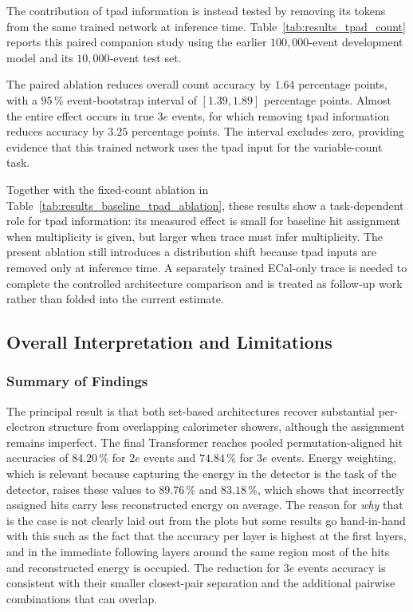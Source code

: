 The contribution of \gls{tpad} information is instead tested by removing its
tokens from the same trained network at inference time.
Table~\ref{tab:results_tpad_count} reports this paired companion study using
the earlier \(100{,}000\)-event development model and its \(10{,}000\)-event
test set.



The paired ablation reduces overall count accuracy by \(1.64\) percentage
points, with a \(95\,\%\) event-bootstrap interval of
\([1.39,1.89]\) percentage points. Almost the entire effect occurs in true
\(3e\) events, for which removing \gls{tpad} information reduces accuracy by
\(3.25\) percentage points. The interval excludes zero, providing evidence
that this trained network uses the \gls{tpad} input for the variable-count
task.

Together with the fixed-count ablation in
Table~\ref{tab:results_baseline_tpad_ablation}, these results show a
task-dependent role for \gls{tpad} information: its measured effect is small
for baseline hit assignment when multiplicity is given, but larger when \gls{trace} must infer multiplicity. The present ablation still
introduces a distribution shift because \gls{tpad} inputs are removed only at
inference time. A separately trained ECal-only \gls{trace} is needed to
complete the controlled architecture comparison and is treated as follow-up
work rather than folded into the current estimate.


\clearpage
\subsection{Overall Interpretation and Limitations}
\label{sec:results_overall_interpretation}

\subsubsection{Summary of Findings}

The principal result is that both set-based architectures recover substantial
per-electron structure from overlapping calorimeter showers, although the
assignment remains imperfect. The final Transformer reaches pooled
permutation-aligned hit accuracies of \(84.20\,\%\) for \(2e\) events and
\(74.84\,\%\) for \(3e\) events. 
Energy weighting, which is relevant because capturing the energy in the detector is the task of the detector, raises these values to
\(89.76\,\%\) and \(83.18\,\%\), which shows that incorrectly assigned hits
carry less reconstructed energy on average. The reason for \textit{why} that is the case is not clearly laid out from the plots but some results go hand-in-hand with this such as the fact that the accuracy per layer is highest at the first layers, and in the immediate following layers around the same region most of the hits and reconstructed energy is occupied. The reduction for \(3e\) events accuracy
is consistent with their smaller closest-pair separation and the additional
pairwise combinations that can overlap.

